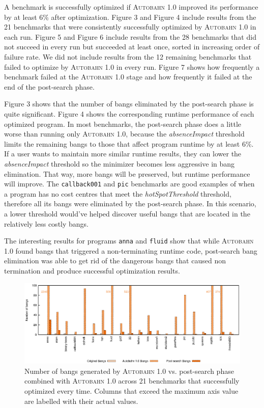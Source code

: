 \documentclass[format=sigplan, review=true]{acmart}
\newcommand{\hotspotcost}[0]{\textit{hotSpotThreshold}}
\newcommand{\dangerous}[0]{dangerous}
\newcommand{\Ao}[0]{\textsc{Autobahn 1.0}}
\newcommand{\postopt}[0]{post-search}
\newcommand{\absim}[0]{\textit{absenceImpact}}
\newcommand{\nonterm}[0]{non-terminating}
\begin{document}
A benchmark is successfully optimized if \Ao{} improved its performance by at least 6\% after optimization. Figure 3 and Figure 4 include results from the 21 benchmarks that were consistently successfully optimized by \Ao{} in each run. Figure 5 and Figure 6 include results from the 28 benchmarks that did not succeed in every run but succeeded at least once, sorted in increasing order of failure rate. We did not include results from the 12 remaining benchmarks that failed to optimize by \Ao{} in every run. Figure 7 shows how frequently a benchmark failed at the \Ao{} stage and how frequently it failed at the end of the \postopt{} phase.

Figure 3 shows that the number of bangs eliminated by the \postopt{} phase is quite significant. Figure 4 shows the corresponding runtime performance of each optimized program. In most benchmarks, the \postopt{} phase does a little worse than running only \Ao{}, because the \absim{} threshold limits the remaining bangs to those that affect program runtime by at least 6\%. If a user wants to maintain more similar runtime results, they can lower the \absim{} threshold so the minimizer becomes less aggressive in bang elimination. That way, more bangs will be preserved, but runtime performance will improve. The \texttt{callback001} and \texttt{pic} benchmarks are good examples of when a program has no cost centres that meet the \hotspotcost{} threshold, therefore all its bangs were eliminated by the \postopt{} phase. In this scenario, a lower threshold would've helped discover useful bangs that are located in the relatively less costly bangs. 

The interesting results for programs \texttt{anna} and \texttt{fluid} show that while \Ao{} found bangs that triggered a \nonterm{} runtime code, \postopt{} bang elimination was able to get rid of the \dangerous{} bangs that caused non termination and produce successful optimization results. 

\begin{figure}
\includegraphics[width=\textwidth]{aut-post-bangs}
\caption{Number of bangs generated by \Ao{} vs. \postopt{} phase combined with \Ao{} across 21 benchmarks that successfully optimized every time. Columns that exceed the maximum axis value are labelled with their actual values. }
\end{figure}
\end{document}
